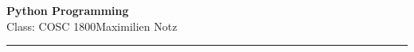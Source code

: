 \documentclass[5pt]{article}
\begin{document}
\begin{center}
     \Large{\textbf{Python Programming}}\\
     \small{Class: COSC 1800}\hfill\small{\textcopyright Maximilien Notz \the\year{}}
     \noindent\rule{20.2cm}{0.4pt}
\end{center}


\begin{multicols}{2}
\setcounter{secnumdepth}{0}


\end{multicols}
\end{document}
